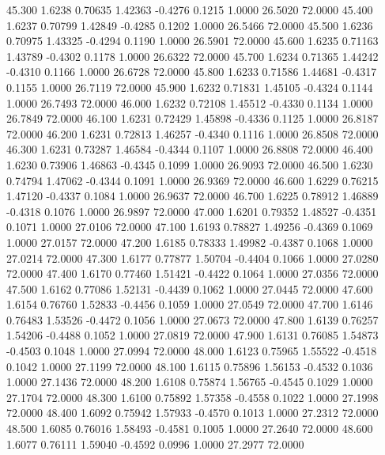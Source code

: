   45.300   1.6238   0.70635   1.42363  -0.4276   0.1215   1.0000  26.5020  72.0000
  45.400   1.6237   0.70799   1.42849  -0.4285   0.1202   1.0000  26.5466  72.0000
  45.500   1.6236   0.70975   1.43325  -0.4294   0.1190   1.0000  26.5901  72.0000
  45.600   1.6235   0.71163   1.43789  -0.4302   0.1178   1.0000  26.6322  72.0000
  45.700   1.6234   0.71365   1.44242  -0.4310   0.1166   1.0000  26.6728  72.0000
  45.800   1.6233   0.71586   1.44681  -0.4317   0.1155   1.0000  26.7119  72.0000
  45.900   1.6232   0.71831   1.45105  -0.4324   0.1144   1.0000  26.7493  72.0000
  46.000   1.6232   0.72108   1.45512  -0.4330   0.1134   1.0000  26.7849  72.0000
  46.100   1.6231   0.72429   1.45898  -0.4336   0.1125   1.0000  26.8187  72.0000
  46.200   1.6231   0.72813   1.46257  -0.4340   0.1116   1.0000  26.8508  72.0000
  46.300   1.6231   0.73287   1.46584  -0.4344   0.1107   1.0000  26.8808  72.0000
  46.400   1.6230   0.73906   1.46863  -0.4345   0.1099   1.0000  26.9093  72.0000
  46.500   1.6230   0.74794   1.47062  -0.4344   0.1091   1.0000  26.9369  72.0000
  46.600   1.6229   0.76215   1.47120  -0.4337   0.1084   1.0000  26.9637  72.0000
  46.700   1.6225   0.78912   1.46889  -0.4318   0.1076   1.0000  26.9897  72.0000
  47.000   1.6201   0.79352   1.48527  -0.4351   0.1071   1.0000  27.0106  72.0000
  47.100   1.6193   0.78827   1.49256  -0.4369   0.1069   1.0000  27.0157  72.0000
  47.200   1.6185   0.78333   1.49982  -0.4387   0.1068   1.0000  27.0214  72.0000
  47.300   1.6177   0.77877   1.50704  -0.4404   0.1066   1.0000  27.0280  72.0000
  47.400   1.6170   0.77460   1.51421  -0.4422   0.1064   1.0000  27.0356  72.0000
  47.500   1.6162   0.77086   1.52131  -0.4439   0.1062   1.0000  27.0445  72.0000
  47.600   1.6154   0.76760   1.52833  -0.4456   0.1059   1.0000  27.0549  72.0000
  47.700   1.6146   0.76483   1.53526  -0.4472   0.1056   1.0000  27.0673  72.0000
  47.800   1.6139   0.76257   1.54206  -0.4488   0.1052   1.0000  27.0819  72.0000
  47.900   1.6131   0.76085   1.54873  -0.4503   0.1048   1.0000  27.0994  72.0000
  48.000   1.6123   0.75965   1.55522  -0.4518   0.1042   1.0000  27.1199  72.0000
  48.100   1.6115   0.75896   1.56153  -0.4532   0.1036   1.0000  27.1436  72.0000
  48.200   1.6108   0.75874   1.56765  -0.4545   0.1029   1.0000  27.1704  72.0000
  48.300   1.6100   0.75892   1.57358  -0.4558   0.1022   1.0000  27.1998  72.0000
  48.400   1.6092   0.75942   1.57933  -0.4570   0.1013   1.0000  27.2312  72.0000
  48.500   1.6085   0.76016   1.58493  -0.4581   0.1005   1.0000  27.2640  72.0000
  48.600   1.6077   0.76111   1.59040  -0.4592   0.0996   1.0000  27.2977  72.0000
